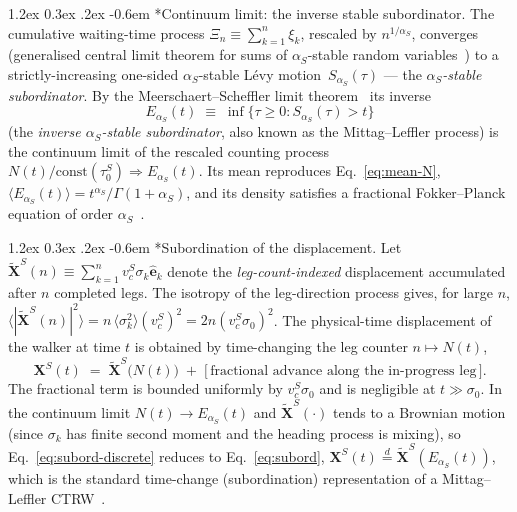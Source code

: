 \documentclass[11pt,a4paper]{article}
\makeatletter
\renewcommand\paragraph{\@startsection{paragraph}{4}{\z@}%
  {1.2ex \@plus 0.3ex \@minus .2ex}%
  {-0.6em}%
  {\normalfont\normalsize\itshape}}
\makeatother
\begin{document}
\paragraph*{Continuum limit: the inverse stable subordinator.}
The cumulative waiting-time process
$\Xi_n\equiv\sum_{k=1}^n\xi_k$, rescaled by $n^{1/\alpha_S}$,
converges (generalised central limit theorem for sums of
$\alpha_S$-stable random variables~\cite{zaburdaev2015}) to a
strictly-increasing one-sided $\alpha_S$-stable Lévy
motion~$S_{\alpha_S}(\tau)$ --- the \emph{$\alpha_S$-stable
subordinator}. By the Meerschaert--Scheffler limit
theorem~\cite{meerschaert2004} its inverse
\begin{equation}
E_{\alpha_S}(t) \;\equiv\; \inf\{\tau\ge 0 : S_{\alpha_S}(\tau) > t\}
\label{eq:inverse-subord}
\end{equation}
(the \emph{inverse $\alpha_S$-stable subordinator}, also known
as the Mittag--Leffler process) is the continuum limit of the
rescaled counting process
$N(t)/\text{const}(\tau_0^S) \Rightarrow E_{\alpha_S}(t)$.
Its mean reproduces Eq.~\eqref{eq:mean-N},
$\langle E_{\alpha_S}(t)\rangle = t^{\alpha_S}/\Gamma(1+\alpha_S)$,
and its density satisfies a fractional Fokker--Planck equation
of order $\alpha_S$~\cite{metzler2000,scalas2004}.

\paragraph*{Subordination of the displacement.}
Let $\tilde{\mathbf{X}}^S(n) \equiv \sum_{k=1}^{n} v_c^S\sigma_k
\hat{\mathbf{e}}_k$ denote the \emph{leg-count-indexed}
displacement accumulated after $n$ completed legs.
The isotropy of the leg-direction process gives, for large $n$,
$\langle|\tilde{\mathbf{X}}^S(n)|^2\rangle = n\,\langle\sigma_k^2\rangle
(v_c^S)^2 = 2 n (v_c^S\sigma_0)^2$.
The physical-time displacement of the walker at time $t$ is
obtained by time-changing the leg counter $n \mapsto N(t)$,
\begin{equation}
\mathbf{X}^S(t) \;=\; \tilde{\mathbf{X}}^S\!\bigl(N(t)\bigr)
\;+\; \bigl[\,\text{fractional advance along the in-progress leg}\,\bigr].
\label{eq:subord-discrete}
\end{equation}
The fractional term is bounded uniformly by $v_c^S\sigma_0$ and
is negligible at $t\gg\sigma_0$. In the continuum limit $N(t)\to
E_{\alpha_S}(t)$ and $\tilde{\mathbf{X}}^S(\cdot)$ tends to a
Brownian motion (since $\sigma_k$ has finite second moment and
the heading process is mixing), so
Eq.~\eqref{eq:subord-discrete} reduces to
Eq.~\eqref{eq:subord},
$\mathbf{X}^S(t)\stackrel{d}{=}\tilde{\mathbf{X}}^S(E_{\alpha_S}(t))$,
which is the standard time-change (subordination) representation
of a Mittag--Leffler CTRW~\cite{scalas2004}.
\end{document}
